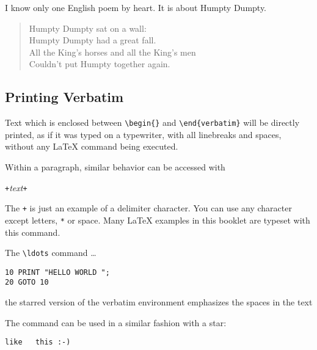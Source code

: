 \begin{example}
I know only one English poem by 
heart. It is about Humpty Dumpty.
\begin{flushleft}
\begin{verse}
Humpty Dumpty sat on a wall:\\
Humpty Dumpty had a great fall.\\ 
All the King's horses and all
the King's men\\
Couldn't put Humpty together
again.
\end{verse}
\end{flushleft}
\end{example}

\subsection{Printing Verbatim}

Text which is enclosed between \verb|\begin{|\verb|}| and
\verb|\end{verbatim}| will be directly printed, as if it was typed on a
typewriter, with all linebreaks and spaces, without any \LaTeX{}
command being executed.

Within a paragraph, similar behavior can be accessed with
\begin{lscommand}
\verb|+|\emph{text}\verb|+|
\end{lscommand}
\noindent The \verb|+| is just an example of a delimiter character. You can use any
character except letters, \verb|*| or space. Many \LaTeX{} examples in this
booklet are typeset with this command.

\begin{example}
The \verb|\ldots| command \ldots

\begin{verbatim}
10 PRINT "HELLO WORLD ";
20 GOTO 10
\end{verbatim}
\end{example}

\begin{example}
\begin{verbatim*}
the starred version of
the      verbatim   
environment emphasizes
the spaces   in the text
\end{verbatim*}
\end{example}

The  command can be used in a similar fashion with a star:

\begin{example}
\verb*|like   this :-) |
\end{example}

